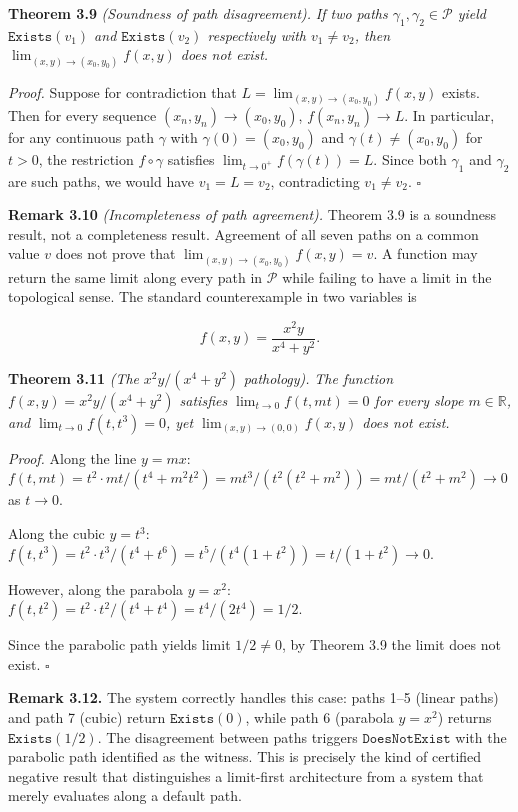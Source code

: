 \documentclass[12pt]{article}
\begin{document}
\textbf{Theorem 3.9} \emph{(Soundness of path disagreement).} \emph{If
two paths \(\gamma_1, \gamma_2 \in \mathcal{P}\) yield
\(\mathtt{Exists}(v_1)\) and \(\mathtt{Exists}(v_2)\) respectively with
\(v_1 \neq v_2\), then \(\lim_{(x,y) \to (x_0,y_0)} f(x,y)\) does not
exist.}

\emph{Proof.} Suppose for contradiction that
\(L = \lim_{(x,y) \to (x_0,y_0)} f(x,y)\) exists. Then for every
sequence \((x_n, y_n) \to (x_0, y_0)\), \(f(x_n, y_n) \to L\). In
particular, for any continuous path \(\gamma\) with
\(\gamma(0) = (x_0, y_0)\) and \(\gamma(t) \neq (x_0,y_0)\) for
\(t > 0\), the restriction \(f \circ \gamma\) satisfies
\(\lim_{t\to 0^+} f(\gamma(t)) = L\). Since both \(\gamma_1\) and
\(\gamma_2\) are such paths, we would have \(v_1 = L = v_2\),
contradicting \(v_1 \neq v_2\). \(\square\)

\textbf{Remark 3.10} \emph{(Incompleteness of path agreement).} Theorem
3.9 is a soundness result, not a completeness result. Agreement of all
seven paths on a common value \(v\) does not prove that
\(\lim_{(x,y)\to(x_0,y_0)} f(x,y) = v\). A function may return the same
limit along every path in \(\mathcal{P}\) while failing to have a limit
in the topological sense. The standard counterexample in two variables
is

\[f(x,y) = \frac{x^2 y}{x^4 + y^2}.\]

\textbf{Theorem 3.11} \emph{(The} \(x^2y/(x^4+y^2)\) \emph{pathology).}
\emph{The function \(f(x,y) = x^2y/(x^4+y^2)\) satisfies
\(\lim_{t\to 0} f(t, mt) = 0\) for every slope \(m \in \mathbb{R}\), and
\(\lim_{t\to 0} f(t, t^3) = 0\), yet \(\lim_{(x,y)\to(0,0)} f(x,y)\)
does not exist.}

\emph{Proof.} Along the line \(y = mx\):
\(f(t, mt) = t^2 \cdot mt / (t^4 + m^2t^2) = mt^3/(t^2(t^2 + m^2)) = mt/(t^2+m^2) \to 0\)
as \(t \to 0\).

Along the cubic \(y = t^3\):
\(f(t, t^3) = t^2 \cdot t^3/(t^4 + t^6) = t^5/(t^4(1+t^2)) = t/(1+t^2) \to 0\).

However, along the parabola \(y = x^2\):
\(f(t, t^2) = t^2 \cdot t^2/(t^4 + t^4) = t^4/(2t^4) = 1/2\).

Since the parabolic path yields limit \(1/2 \neq 0\), by Theorem 3.9 the
limit does not exist. \(\square\)

\textbf{Remark 3.12.} The system correctly handles this case: paths 1--5
(linear paths) and path 7 (cubic) return \(\mathtt{Exists}(0)\), while
path 6 (parabola \(y = x^2\)) returns \(\mathtt{Exists}(1/2)\). The
disagreement between paths triggers \(\mathtt{DoesNotExist}\) with the
parabolic path identified as the witness. This is precisely the kind of
certified negative result that distinguishes a limit-first architecture
from a system that merely evaluates along a default path.
\end{document}
